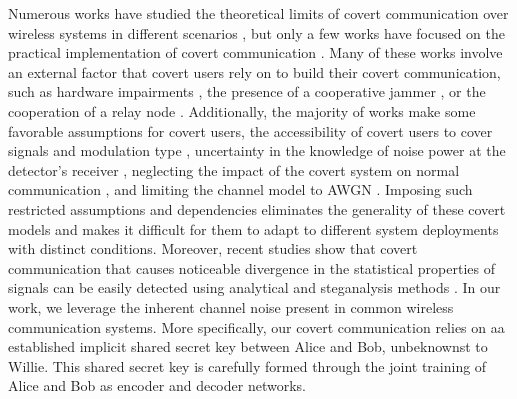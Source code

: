 Numerous works have studied the theoretical limits of covert communication over wireless systems in different scenarios \cite{bash2012square, soltani2018covert, sheikholeslami2018multi, li2021fundamental}, but only a few works have focused on the practical implementation of covert communication \cite{dutta2012secret, cao2018wireless, liao2020generative, mohammed2021adversarial}. Many of these works involve an external factor that covert users rely on to build their covert communication, such as hardware impairments \cite{mohammed2021adversarial}, the presence of a cooperative jammer \cite{sobers2017covert}, or the cooperation of a relay node \cite{liao2020generative, kim2022covert}. Additionally, the majority of works make some favorable assumptions for covert users, the accessibility of covert users to cover signals and modulation type \cite{grzesiak2021wireless}, uncertainty in the knowledge of noise power at the detector's receiver \cite{he2017covert}, neglecting the impact of the covert system on normal communication \cite{mohammed2021adversarial}, and limiting the channel model to AWGN \cite{mohammed2021adversarial}. Imposing such restricted assumptions and dependencies eliminates the generality of these covert models and makes it difficult for them to adapt to different system deployments with distinct conditions. Moreover, recent studies show that covert communication that causes noticeable divergence in the statistical properties of signals can be easily detected using analytical and steganalysis methods \cite{bahramali2021robust, huang2020exploiting}. In our work, we leverage the inherent channel noise present in common wireless communication systems. More specifically, our covert communication relies on aa established implicit shared secret key between Alice and Bob, unbeknownst to Willie. This shared secret key is carefully formed through the joint training of Alice and Bob as encoder and decoder networks.

